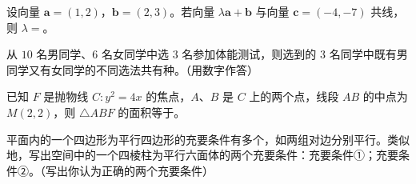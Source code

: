 \begin{question}
设向量 $\boldsymbol a=(1,2)$，$\boldsymbol b=(2,3)$。若向量 $\lambda\boldsymbol a+\boldsymbol b$ 与向量 $\boldsymbol c=(-4,-7)$ 共线，则 $\lambda=$\gkblank{}。

\end{question}
\begin{question}
从 $10$ 名男同学、$6$ 名女同学中选 $3$ 名参加体能测试，则选到的 $3$ 名同学中既有男同学又有女同学的不同选法共有\gkblank{}种。（用数字作答）

\end{question}
\begin{question}
已知 $F$ 是抛物线 $C:y^2=4x$ 的焦点，$A\text{、}B$ 是 $C$ 上的两个点，线段 $AB$ 的中点为 $M(2,2)$，则 $\triangle ABF$ 的面积等于\gkblank{}。

\end{question}
\begin{question}
平面内的一个四边形为平行四边形的充要条件有多个，如两组对边分别平行。类似地，写出空间中的一个四棱柱为平行六面体的两个充要条件：充要条件①\gkblank{}；充要条件②\gkblank{}。（写出你认为正确的两个充要条件）

\end{question}

